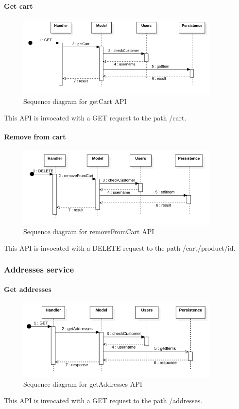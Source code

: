 \paragraph*{Get cart}
\begin{figure}[H]
    \includegraphics[width=0.9\textwidth]{res/images/sequence-diagrams/carts/getCart.png}
    \caption{Sequence diagram for getCart API}
\end{figure}
This API is invocated with a GET request to the path /cart.

\paragraph*{Remove from cart}
\begin{figure}[H]
    \includegraphics[width=0.9\textwidth]{res/images/sequence-diagrams/carts/removeFromCart.png}
    \caption{Sequence diagram for removeFromCart API}
\end{figure}
This API is invocated with a DELETE request to the path /cart/product/{id}.

\subsubsection{Addresses service}
\paragraph*{Get addresses}
\begin{figure}[H]
    \includegraphics[width=0.9\textwidth]{res/images/sequence-diagrams/addresses/getAddresses.png}
    \caption{Sequence diagram for getAddresses API}
\end{figure}
This API is invocated with a GET request to the path /addresses.

